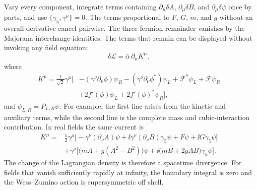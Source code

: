 \begin{enumerate}
Vary every component, integrate terms containing
\(\partial_\mu\delta A\), \(\partial_\mu\delta B\), and
\(\partial_\mu\delta\psi\) once by parts, and use
\(\{\gamma_5,\gamma^\mu\}=0\).  The terms proportional to \(F\), \(G\),
\(m\), and \(g\) without an overall derivative cancel pairwise.  The
three-fermion remainder vanishes by the Majorana interchange identities.
The terms that remain can be displayed without invoking any field equation:
\[
 \delta\mathcal L=\bar\alpha\,\partial_\mu K^\mu ,
\]
where
\[
\begin{aligned}
 K^\mu=\frac1{\sqrt2}\gamma^\mu\Big[
 &-(\gamma^\nu\partial_\nu\phi)\psi_R
  -(\gamma^\nu\partial_\nu\phi^*)\psi_L
  +\mathcal F^*\psi_L+\mathcal F\psi_R\\
 &+2f'(\phi)\psi_L+2f'(\phi)^*\psi_R
 \Big],
\end{aligned}
\]
and \(\psi_{L,R}=P_{L,R}\psi\).  For example, the first line arises from the
kinetic and auxiliary terms, while the second line is the complete mass and
cubic-interaction contribution.  In real fields the same current is
\[
\begin{aligned}
 K^\mu={}&\frac12\gamma^\mu\Big[
   -\gamma^\nu(\partial_\nu A)\psi
   +\ii\gamma^\nu(\partial_\nu B)\gamma_5\psi
   +F\psi+\ii G\gamma_5\psi\Big]\\
 &+\gamma^\mu\Big[
   \bigl(mA+g(A^2-B^2)\bigr)\psi
   +\ii\bigl(mB+2gAB\bigr)\gamma_5\psi\Big].
\end{aligned}
\]
The change of the Lagrangian density is therefore a spacetime divergence.
For fields that vanish sufficiently rapidly at infinity, the boundary
integral is zero and the Wess--Zumino action is supersymmetric off shell.
\end{enumerate}
